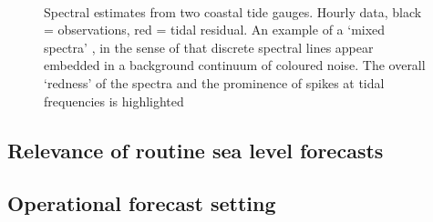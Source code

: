 \begin{figure}[h]\centering
	 \\
	\caption{Spectral estimates from two coastal tide gauges. Hourly data, black = observations, red = tidal residual. An example of a `mixed spectra' \citep{Percival:1998tw}, in the sense of that discrete spectral lines appear embedded in a background continuum of coloured noise.  The overall `redness' of the spectra and the prominence of spikes at tidal frequencies is highlighted }
    \label{fig:SPECTRA_EG}
\end{figure}


\subsection{Relevance of routine sea level forecasts}



\subsection{Operational forecast setting}
\label{S:operational_setting}

